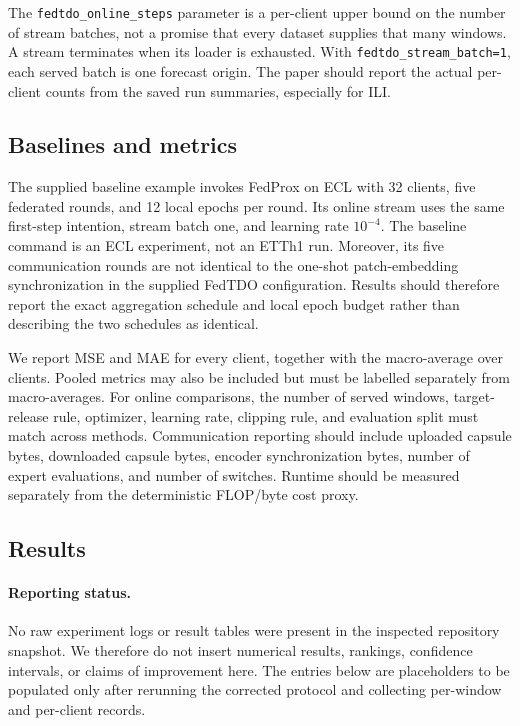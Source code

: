 \documentclass{article}
\theoremstyle{definition}
\begin{document}
The \texttt{fedtdo\_online\_steps} parameter is a per-client upper bound on the number of stream batches, not a promise that every dataset supplies that many windows. A stream terminates when its loader is exhausted. With \texttt{fedtdo\_stream\_batch=1}, each served batch is one forecast origin. The paper should report the actual per-client counts from the saved run summaries, especially for ILI.

\subsection{Baselines and metrics}

The supplied baseline example invokes FedProx on ECL with 32 clients, five federated rounds, and 12 local epochs per round. Its online stream uses the same first-step intention, stream batch one, and learning rate \(10^{-4}\). The baseline command is an ECL experiment, not an ETTh1 run. Moreover, its five communication rounds are not identical to the one-shot patch-embedding synchronization in the supplied FedTDO configuration. Results should therefore report the exact aggregation schedule and local epoch budget rather than describing the two schedules as identical.

We report MSE and MAE for every client, together with the macro-average over clients. Pooled metrics may also be included but must be labelled separately from macro-averages. For online comparisons, the number of served windows, target-release rule, optimizer, learning rate, clipping rule, and evaluation split must match across methods. Communication reporting should include uploaded capsule bytes, downloaded capsule bytes, encoder synchronization bytes, number of expert evaluations, and number of switches. Runtime should be measured separately from the deterministic FLOP/byte cost proxy.

\subsection{Results}

\paragraph{Reporting status.}
No raw experiment logs or result tables were present in the inspected repository snapshot. We therefore do not insert numerical results, rankings, confidence intervals, or claims of improvement here. The entries below are placeholders to be populated only after rerunning the corrected protocol and collecting per-window and per-client records.
\end{document}
